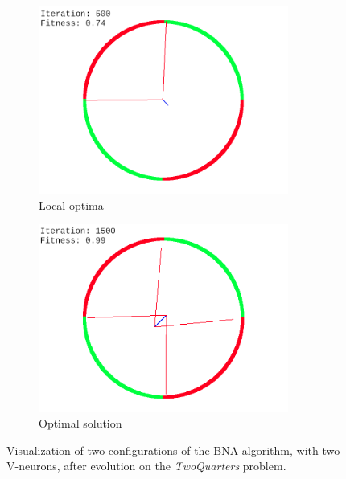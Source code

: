 \begin{figure}
    \centering
    \begin{subfigure}{0.45\textwidth}
        \centering
        \includegraphics[width=0.9\textwidth]{Pictures/bna-twoquarters-localopt}
       \caption{Local optima}
    \end{subfigure}\hfill
    \begin{subfigure}{0.45\textwidth}
        \centering
        \includegraphics[width=0.9\textwidth]{Pictures/bna-twoquarters-opt}
        \caption{Optimal solution}
    \end{subfigure}
    \caption{Visualization of two configurations of the BNA algorithm, with two V-neurons, after evolution on the \textit{TwoQuarters} problem.}
    \label{fig:bna_twoquarters_visual}
\end{figure}

